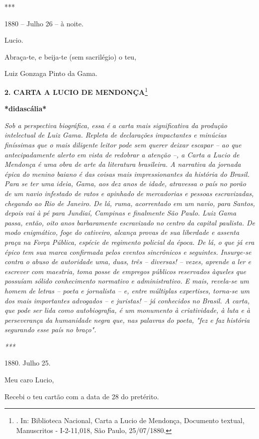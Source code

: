 ***

1880 -- Julho 26 -- à noite.

Lucio.

Abraça-te, e beija-te (sem sacrilégio) o teu,

Luiz Gonzaga Pinto da Gama.

\textbf{2. CARTA A LUCIO DE MENDONÇA}\footnote{. In: Biblioteca
  Nacional, Carta a Lucio de Mendonça, Documento textual, Manuscritos -
  I-2-11,018, São Paulo, 25/07/1880.}

\textbf{*didascália*}

\emph{Sob a perspectiva biográfica, essa é a carta mais significativa da
produção intelectual de Luiz Gama. Repleta de declarações impactantes e
minúcias finíssimas que o mais diligente leitor pode sem querer deixar
escapar -- ao que antecipadamente alerto em vista de redobrar a atenção
--, a Carta a Lucio de Mendonça é uma obra de arte da literatura
brasileira. A narrativa da jornada épica do menino baiano é das coisas
mais impressionantes da história do Brasil. Para se ter uma ideia, Gama,
aos dez anos de idade, atravessa o país no porão de um navio infestado
de ratos e apinhado de mercadorias e pessoas escravizadas, chegando ao
Rio de Janeiro. De lá, ruma, acorrentado em um navio, para Santos,
depois vai à pé para Jundiaí, Campinas e finalmente São Paulo. Luiz Gama
passa, então, oito anos barbaramente escravizado no centro da capital
paulista. De modo enigmático, foge do cativeiro, alcança provas de sua
liberdade e assenta praça na Força Pública, espécie de regimento
policial da época. De lá, o que já era épico tem sua marca confirmada
pelos eventos sincrônicos e seguintes. Insurge-se contra o abuso de
autoridade uma, duas, três -- diversas! -- vezes, aprende a ler e
escrever com maestria, toma posse de empregos públicos reservados
àqueles que possuíam sólido conhecimento normativo e administrativo. E
mais, revela-se um homem de letras -- poeta e jornalista -- e, entre
múltiplas expertises, torna-se um dos mais importantes advogados -- e
juristas! -- já conhecidos no Brasil. A carta, que pode ser lida como
autobiografia, é um monumento à criatividade, à luta e à perseverança da
humanidade negra que, nas palavras do poeta, "fez e faz história
segurando esse país no braço". }

\emph{***}

1880. Julho 25.

Meu caro Lucio,

Recebi o teu cartão com a data de 28 do pretérito.

